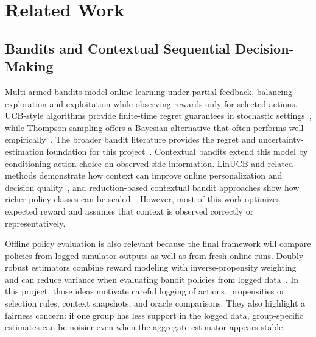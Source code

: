 \documentclass[conference]{IEEEtran}
\begin{document}
\section{Related Work}
\subsection{Bandits and Contextual Sequential Decision-Making}
Multi-armed bandits model online learning under partial feedback, balancing
exploration and exploitation while observing rewards only for selected
actions. UCB-style algorithms provide finite-time regret guarantees in
stochastic settings~\cite{auer2002finite}, while Thompson sampling offers a
Bayesian alternative that often performs well empirically~\cite{russo2018tutorial}.
The broader bandit literature provides the regret and uncertainty-estimation
foundation for this project~\cite{lattimore2020bandit}. Contextual bandits
extend this model by conditioning action choice on observed side information.
LinUCB and related methods demonstrate how context can improve online
personalization and decision quality~\cite{li2010contextual,abbasi2011linear},
and reduction-based contextual bandit approaches show how richer policy
classes can be scaled~\cite{agarwal2014taming}. However, most of this work
optimizes expected reward and assumes that context is observed correctly or
representatively.

Offline policy evaluation is also relevant because the final framework will
compare policies from logged simulator outputs as well as from fresh online
runs. Doubly robust estimators combine reward modeling with inverse-propensity
weighting and can reduce variance when evaluating bandit policies from logged
data~\cite{dudik2011doubly}. In this project, those ideas motivate careful
logging of actions, propensities or selection rules, context snapshots, and
oracle comparisons. They also highlight a fairness concern: if one group has
less support in the logged data, group-specific estimates can be noisier even
when the aggregate estimator appears stable.
\end{document}
